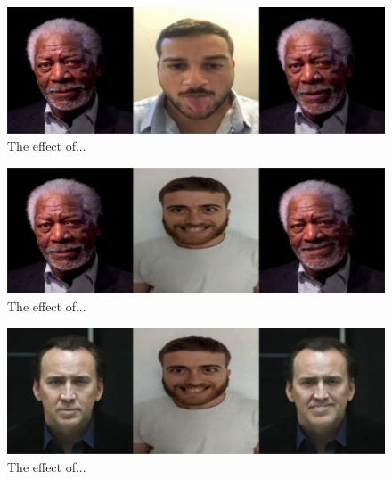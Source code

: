 \documentclass[english,12pt]{article}
\begin{document}
\begin{figure}[htb]
  \begin{centering}
      \includegraphics[scale=0.25]{images/‏‏Amit_tongue_freeman.PNG}
  \par\end{centering}
  \caption{\label{fig:Amit_tongue_freeman}The effect of...}
\end{figure}

\begin{figure}[htb]
  \begin{centering}
      \includegraphics[scale=0.25]{images/Oren_smile_freeman.PNG}
  \par\end{centering}
  \caption{\label{fig:Oren_smile_freeman}The effect of...}
\end{figure}

\begin{figure}[htb]
  \begin{centering}
      \includegraphics[scale=0.25]{images/‏‏Oren_smile_cage.PNG}
  \par\end{centering}
  \caption{\label{fig:Oren_smile_cage}The effect of...}
\end{figure}
\end{document}
